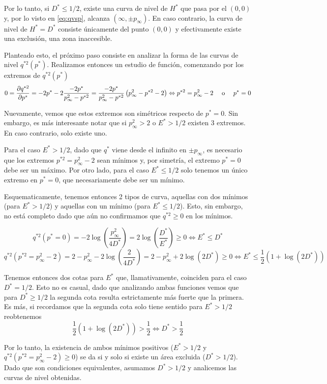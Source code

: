 Por lo tanto, si $D^*\leq 1/2$, existe una curva de nivel de $H^*$ que pasa por el $(0,0)$ y, por lo visto en \ref{eq:qvsp}, alcanza $(\infty, \pm p_\infty)$.
En caso contrario, la curva de nivel de $H^*= D^*$ consiste únicamente del punto $(0,0)$ y efectivamente existe una exclusión, una zona inaccesible.

Planteado esto, el próximo paso consiste en analizar la forma de las curvas de nivel $q^{*2}(p^*)$.
Realizamos entonces un estudio de función, comenzando por los extremos de $q^{*2}(p^*)$
\[ 0 = \frac{\partial q^{*2}}{\partial p^*} = -2p^* - 2\frac{-2p^*}{p_\infty^2-p^{*2}}
= \frac{-2p^*}{p_\infty^2-p^{*2}} \left( p_\infty^2-p^{*2} - 2 \right) \Leftrightarrow p^{*2} = p_\infty^2 - 2 \quad \text{ o } \quad p^* = 0 \]

Nuevamente, vemos que estos extremos son simétricos respecto de $p^*=0$.
Sin embargo, es más interesante notar que si $p_\infty^2 > 2$ o $E^* > 1/2$ existen 3 extremos.
En caso contrario, solo existe uno.

Para el caso $E^* > 1/2$, dado que $q^*$ viene desde el infinito en $\pm p_\infty$, es necesario que los extremos $p^{*2} = p_\infty^2 - 2$ sean mínimos y, por simetría, el extremo $p^*=0$ debe ser un máximo. Por otro lado, para el caso $E^*\leq 1/2$ solo tenemos un único extremo en $p^*=0$, que necesariamente debe ser un mínimo.

Esquematicamente, tenemos entonces 2 tipos de curva, aquellas con dos mínimos (para $E^* > 1/2$) y aquellas con un mínimo (para $E^* \leq 1/2$).
Esto, sin embargo, no está completo dado que aún no confirmamos que $q^{*2}\geq 0$ en los mínimos.

\[ q^{*2}(p^*=0) = -2\log \left( \frac{p_\infty^2}{4D^*} \right) = 2\log \left( \frac{D^*}{E^*} \right) \geq 0 \Leftrightarrow E^*\leq D^* \]
\[ q^{*2}(p^{*2}=p^2_\infty-2) = 2-p_\infty^2 -2\log \left( \frac{2}{4D^*} \right) = 2 - p_\infty^2 + 2\log \left( 2D^* \right) \geq 0 \Leftrightarrow E^*\leq \frac{1}{2}\left( 1 + \log(2D^*) \right)  \]

Tenemos entonces dos cotas para $E^*$ que, llamativamente, coinciden para el caso $D^*=1/2$.
Esto no es casual, dado que analizando ambas funciones vemos que para $D^*\geq1/2$ la segunda cota resulta estrictamente más fuerte que la primera.
Es más, si recordamos que la segunda cota solo tiene sentido para $E^*>1/2$ reobtenemos
\[ \frac{1}{2} ( 1 + \log(2D^*) ) > \frac{1}{2} \Longleftrightarrow D^* > \frac{1}{2} \]

Por lo tanto, la existencia de ambos mínimos positivos ($E^*>1/2$ y $q^{*2}(p^{*2}=p^2_\infty-2)\geq 0$) se da si y solo si existe un área excluida ($D^*>1/2$).
Dado que son condiciones equivalentes, asumamos $D^*>1/2$ y analicemos las curvas de nivel obtenidas.

